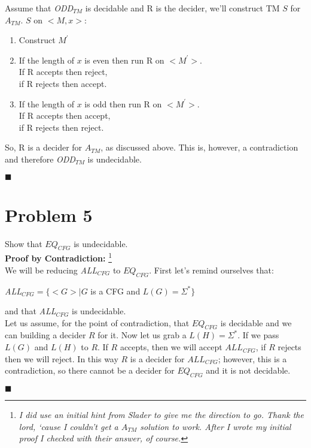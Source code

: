 \documentclass[11pt]{article}
\begin{document}
    Assume that {\em ODD}$_{TM}$ is decidable and R is the decider, we'll construct TM $S$ for $A_{TM}$. $S$ on $<M,x>$:
    \begin{enumerate}
        \item Construct $M^\prime$
        \item If the length of $x$ is even then run R on $<M^\prime>$.\\
              If R accepts then reject,\\
              if R rejects then accept.
        \item If the length of $x$ is odd then run R on $<M^\prime>$.\\
              If R accepts then accept,\\
              if R rejects then reject.
    \end{enumerate}
    So, R is a decider for $A_{TM}$, as discussed above. This is, however, a contradiction and therefore {\em ODD}$_{TM}$ is undecidable. 
    \begin{flushright}$\blacksquare$\end{flushright}
\newpage





\section*{Problem 5}

    Show that $EQ_{CFG}$ is undecidable.\\
    
    \textbf{Proof by Contradiction:}
    \footnote{\em I did use an initial hint from Slader to give me the direction to go. Thank the lord, `cause I couldn't get a $A_{TM}$ solution to work. After I wrote my initial proof I checked with their answer, of course.}\\
    
    
    We will be reducing {\em ALL}$_{CFG}$ to $EQ_{CFG}$. First let's remind ourselves that:
    \begin{center}
        {\em ALL}$_{CFG} = \{<G> | G$ is a CFG and $L(G) = \Sigma ^*\}$
    \end{center}
    and that {\em ALL}$_{CFG}$ is undecidable. \\
    
    Let us assume, for the point of contradiction, that $EQ_{CFG}$ is decidable and we can building a decider $R$ for it. Now let us grab a $L(H) = \Sigma ^*$. If we pass $L(G)$ and $L(H)$ to $R$. If $R$ accepts, then we will accept $ALL_{CFG}$, if $R$ rejects then we will reject. In this way $R$ is a decider for $ALL_{CFG}$; however, this is a contradiction, so there cannot be a decider for $EQ_{CFG}$ and it is not decidable. 
    \begin{flushright}$\blacksquare$\end{flushright}
\newpage
\end{document}
